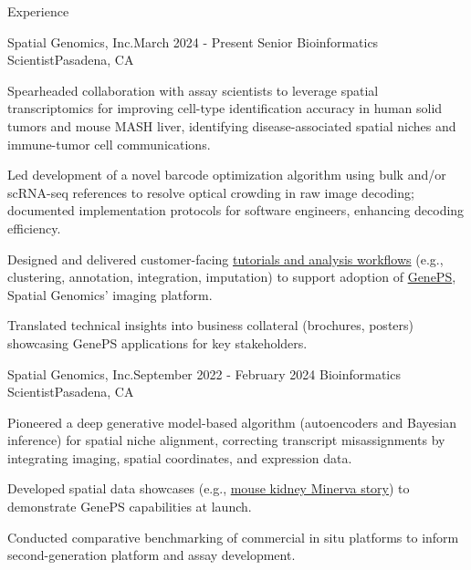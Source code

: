 \documentclass{resume} %
\begin{document}

\begin{rSection}{Experience}
\begin{rSubsection}{Spatial Genomics, Inc.}{March 2024 - Present}
{Senior Bioinformatics Scientist}{Pasadena, CA}
\item Spearheaded collaboration with assay scientists to leverage spatial transcriptomics for improving cell-type identification accuracy in human solid tumors and mouse MASH liver, identifying disease-associated spatial niches and immune-tumor cell communications.

\item Led development of a novel barcode optimization algorithm using bulk and/or scRNA-seq references to resolve optical crowding in raw image decoding; documented implementation protocols for software engineers, enhancing decoding efficiency.

\item Designed and delivered customer-facing \href{https://tutorials.spatialgenomics.com/intro.html}{tutorials and analysis workflows} (e.g., clustering, annotation, integration, imputation) to support adoption of \href{https://spatialgenomics.com/product/}{GenePS}, Spatial Genomics’ imaging platform.

\item Translated technical insights into business collateral (brochures, posters) showcasing GenePS applications for key stakeholders.
\end{rSubsection}

\begin{rSubsection}{Spatial Genomics, Inc.}{September 2022 - February 2024}
{Bioinformatics Scientist}{Pasadena, CA}
\item Pioneered a deep generative model-based algorithm (autoencoders and Bayesian inference) for spatial niche alignment, correcting transcript misassignments by integrating imaging, spatial coordinates, and expression data.

\item Developed spatial data showcases (e.g., \href{http://kidneyviewer.spatialgenomics.com/}{mouse kidney Minerva story}) to demonstrate GenePS capabilities at launch.

\item Conducted comparative benchmarking of commercial in situ platforms to inform second-generation platform and assay development.


\end{rSubsection}
\end{rSection}
\end{document}
